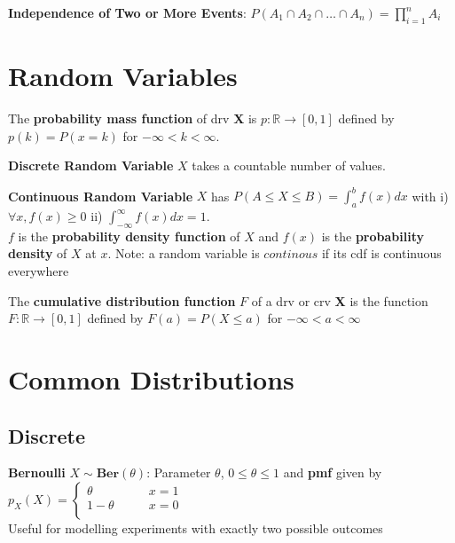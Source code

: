 \documentclass[5pt]{article}
\begin{document}
\begin{definition}
\textbf{Independence of Two or More Events}: $P(A_1\cap A_2 \cap \dots \cap A_n) = \prod^n_{i=1}A_i$
\end{definition}

\section{Random Variables}
\begin{definition}
The \textbf{probability mass function} of drv \textbf{X} is $p: \mathbb{R} \to [0,1]$ defined by $p(k) = P(x=k)$ for $-\infty < k < \infty$.
\end{definition}

\begin{definition}
\textbf{Discrete Random Variable} $X$ takes a countable number of values.
\end{definition}

\begin{definition}
\textbf{Continuous Random Variable} $X$ has $P(A\leq X \leq B) = \int^b_a f(x) dx$ with i) $\forall x, f(x) \geq 0$ ii) $\int^\infty_{-\infty}f(x)dx = 1$.\\
$f$ is the \textbf{probability density function} of $X$ and $f(x)$ is the \textbf{probability density} of $X$ at $x$. Note: a random variable is $continous$ if its cdf is continuous everywhere
\end{definition}

\begin{definition}
The \textbf{cumulative distribution function} $F$ of a drv or crv \textbf{X} is the function $F: \mathbb{R}\to [0,1]$ defined by $F(a) = P(X \leq a)$ for $-\infty < a < \infty$
\end{definition}

\section{Common Distributions}
\subsection{Discrete}
\begin{definition}
\textbf{Bernoulli} $X \sim \textbf{Ber}(\theta)$: Parameter $\theta$, $0 \leq \theta \leq 1$ and \textbf{pmf} given by
$
p_X(X)=
\begin{cases}
\theta &\qquad x = 1\\
1 - \theta &\qquad x = 0\\ 
\end{cases}$\\
Useful for modelling experiments with exactly two possible outcomes
\end{definition}
\end{document}
